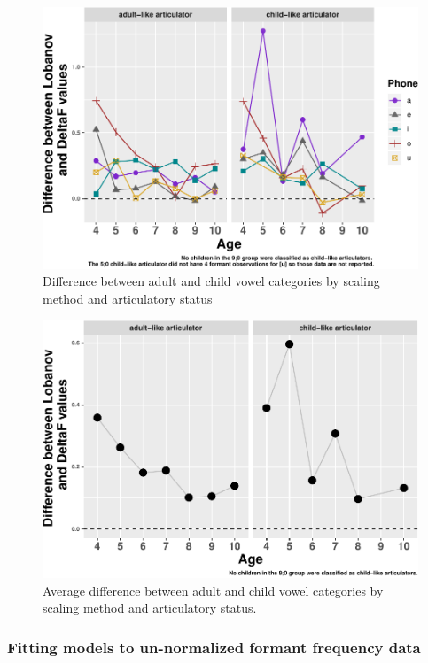 \documentclass[
]{article}
\begin{document}
\begin{figure}
\centering
\includegraphics{3_vtl_results_files/figure-latex/visualize-diff-coef-1.pdf}
\caption{\label{fig:visualize-diff-coef}Difference between adult and child vowel categories by scaling method and articulatory status}
\end{figure}

\begin{figure}
\centering
\includegraphics{3_vtl_results_files/figure-latex/visualize-diff-coef-avg-1.pdf}
\caption{\label{fig:visualize-diff-coef-avg}Average difference between adult and child vowel categories by scaling method and articulatory status.}
\end{figure}

\hypertarget{fitting-models-to-un-normalized-formant-frequency-data}{%
\subsubsection{Fitting models to un-normalized formant frequency data}\label{fitting-models-to-un-normalized-formant-frequency-data}}
\end{document}
